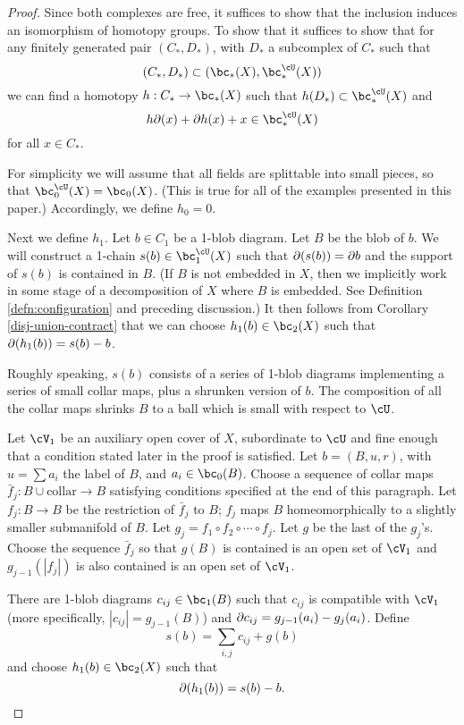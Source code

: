\begin{proof}
Since both complexes are free, it suffices to show that the inclusion induces
an isomorphism of homotopy groups.
To show that it suffices to show that for any finitely generated 
pair $(C_*, D_*)$, with $D_*$ a subcomplex of $C_*$ such that 
\[
	(C_*, D_*) \sub (\bc_*(X), \sbc_*(X))
\]
we can find a homotopy $h:C_*\to \bc_*(X)$ such that $h(D_*) \sub \sbc_*(X)$
and
\[
	h\bd(x) + \bd h(x) + x \in \sbc_*(X)
\]
for all $x\in C_*$.

For simplicity we will assume that all fields are splittable into small pieces, so that
$\sbc_0(X) = \bc_0(X)$.
(This is true for all of the examples presented in this paper.)
Accordingly, we define $h_0 = 0$.

Next we define $h_1$.
Let $b\in C_1$ be a 1-blob diagram.
Let $B$ be the blob of $b$.
We will construct a 1-chain $s(b)\in \sbc_1(X)$ such that $\partial(s(b)) = \partial b$
and the support of $s(b)$ is contained in $B$.
(If $B$ is not embedded in $X$, then we implicitly work in some stage of a decomposition
of $X$ where $B$ is embedded.
See Definition \ref{defn:configuration} and preceding discussion.)
It then follows from Corollary \ref{disj-union-contract} that we can choose
$h_1(b) \in \bc_2(X)$ such that $\partial(h_1(b)) = s(b) - b$.

Roughly speaking, $s(b)$ consists of a series of 1-blob diagrams implementing a series
of small collar maps, plus a shrunken version of $b$.
The composition of all the collar maps shrinks $B$ to a ball which is small with respect to $\cU$.

Let $\cV_1$ be an auxiliary open cover of $X$, subordinate to $\cU$ and 
fine enough that a condition stated later in the proof is satisfied.
Let $b = (B, u, r)$, with $u = \sum a_i$ the label of $B$, and $a_i\in \bc_0(B)$.
Choose a sequence of collar maps $\bar{f}_j:B\cup\text{collar}\to B$ satisfying conditions 
specified at the end of this paragraph.
Let $f_j:B\to B$ be the restriction of $\bar{f}_j$ to $B$; $f_j$ maps $B$ homeomorphically to 
a slightly smaller submanifold of $B$.
Let $g_j = f_1\circ f_2\circ\cdots\circ f_j$.
Let $g$ be the last of the $g_j$'s.
Choose the sequence $\bar{f}_j$ so that 
$g(B)$ is contained is an open set of $\cV_1$ and
$g_{j-1}(|f_j|)$ is also contained is an open set of $\cV_1$.

There are 1-blob diagrams $c_{ij} \in \bc_1(B)$ such that $c_{ij}$ is compatible with $\cV_1$
(more specifically, $|c_{ij}| = g_{j-1}(B)$)
and $\partial c_{ij} = g_{j-1}(a_i) - g_{j}(a_i)$.
Define
\[
	s(b) = \sum_{i,j} c_{ij} + g(b)
\]
and choose $h_1(b) \in \bc_2(X)$ such that 
\[
	\partial(h_1(b)) = s(b) - b .
\]


\end{proof}
